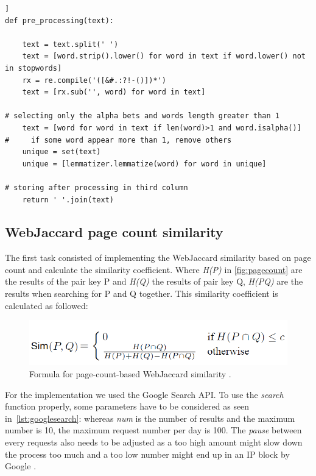 \documentclass[conference]{IEEEtran}
\begin{document}
\begin{lstlisting}[frame=single, label=lst:preproc, caption={Pre-processing for synsets of word length>1}, captionpos=b]]
def pre_processing(text):

    text = text.split(' ')
    text = [word.strip().lower() for word in text if word.lower() not in stopwords]
    rx = re.compile('([&#.:?!-()])*')
    text = [rx.sub('', word) for word in text]
    
# selecting only the alpha bets and words length greater than 1
    text = [word for word in text if len(word)>1 and word.isalpha()]
#     if some word appear more than 1, remove others
    unique = set(text)
    unique = [lemmatizer.lemmatize(word) for word in unique]
    
# storing after processing in third column
    return ' '.join(text)
\end{lstlisting}

\subsection{WebJaccard page count similarity}\label{subsec:webjac}
The first task consisted of implementing the WebJaccard similarity based on page count and calculate the similarity coefficient. Where \textit{H(P)} in \ref{fig:pagecount} are the results of the pair key P and \textit{H(Q)} the results of pair key Q, \textit{H(PQ)} are the results when searching for P and Q together. This similarity coefficient  is calculated as followed:
\begin{figure}[h]\label{fig:pagecount}
\centerline{\includegraphics[scale=0.6]{img/pagecount.png}}
\caption{Formula for page-count-based WebJaccard similarity \cite{websim}.}
\label{fig}
\end{figure}

For the implementation we used the Google Search API. To use the \textit{search} function properly, some parameters have to be considered as seen in~\ref{lst:googlesearch}: whereas \textit{num} is the number of results and the maximum number is 10, the maximum request number per day is 100. The \textit{pause} between every requests also needs to be adjusted as a too high amount might slow down the process too much and a too low number might end up in an IP block by Google \cite{search}.
\end{document}
